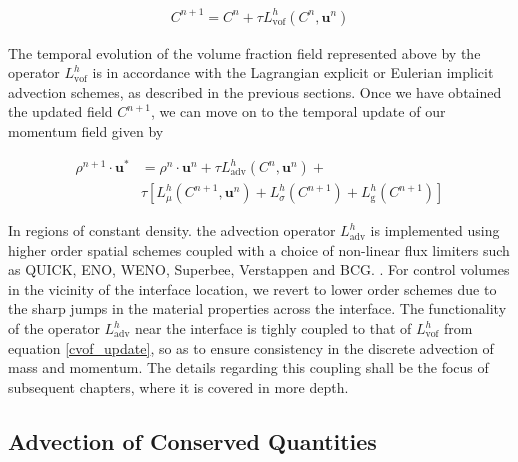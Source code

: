 \begin{align}
	C^{n+1} = C^{n} + \tau L^{h}_{\textrm{vof}}\left( C^{n},\boldsymbol{u}^{n}\right)  
\label{cvof_update}
\end{align}

The temporal evolution of the volume fraction field represented above by the 
operator $L^{h}_{\textrm{vof}}$ is in accordance with the Lagrangian explicit or Eulerian implicit 
advection schemes, as described in the previous sections. 
Once we have obtained the updated field $C^{n+1}$, we can move on to 
the temporal update of our momentum field given by 

\begin{align}
	\rho^{n+1}\cdot \boldsymbol{u}^{*} &= \rho^{n}\cdot \boldsymbol{u}^{n} + \tau L^{h}_{\textrm{adv}}\left( C^{n},\boldsymbol{u}^{n} \right) + \nonumber \\
				      & \tau \left[ L^{h}_{\mu}\left(C^{n+1},\boldsymbol{u}^{n}\right) + L^{h}_{\sigma}\left(C^{n+1}\right) + L^{h}_{\textrm{g}}\left(C^{n+1}\right)\right]
\label{mom_update}
\end{align}

In regions of constant density. the advection operator $L^{h}_{\textrm{adv}}$ 
is implemented using higher order spatial schemes 
coupled with a choice of non-linear flux limiters such as 
QUICK, ENO, WENO, Superbee, Verstappen and BCG.
. 
For control volumes in the vicinity of the interface location, we revert to lower order
schemes due to the sharp jumps in the material properties across the interface.  
The functionality of the operator $L^{h}_{\textrm{adv}}$ near the interface is tighly coupled
to that of $L^{h}_{\textrm{vof}}$ from equation \ref{cvof_update}, 
so as to ensure consistency in the discrete advection of mass and momentum.
The details regarding this coupling shall be the focus 
of subsequent chapters, where it is covered in more depth.


\subsection*{Advection of Conserved Quantities}

\newcommand{\dert}[1]{\frac{\partial #1}{\partial t}}
\newcommand{\cijk}{C_{i,j,k}}
\newcommand{\pijk}{\phi_{i,j,k}}
\newcommand{\X}{\boldsymbol{x}}
\newcommand{\N}{\boldsymbol{n}}
\newcommand{\rijk}{\rho_{i,j,k}}
\newcommand\mijk{(\rho u_{q})_{i,j,k}}

